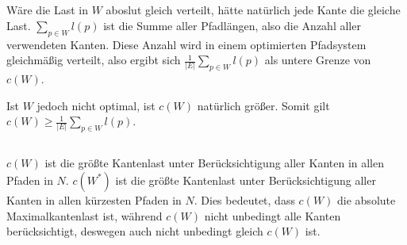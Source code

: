 \documentclass[10pt,a4paper,oneside,ngerman,numbers=noenddot]{scrartcl}
\begin{document}
\section{} %
	\subsection{} %
	\subsection{} %
	\subsection{} %
\section{} %
	\subsection{} %
		Wäre die Last in $W$ aboslut gleich verteilt, hätte natürlich jede Kante die gleiche Last.
		$ \sum_{p \in W} l(p) $ ist die Summe aller Pfadlängen, also die Anzahl aller verwendeten Kanten.
		Diese Anzahl wird in einem optimierten Pfadsystem gleichmäßig verteilt, also ergibt sich
		$ \frac{1}{|E|} \sum_{p \in W} l(p) $ als untere Grenze von $ c(W) $.

		Ist $ W $ jedoch nicht optimal, ist $ c(W) $ natürlich größer. Somit gilt
		$ c(W) \ge \frac{1}{|E|} \sum_{p \in W} l(p) $.
	\subsection{} %
		$ c(W) $ ist die größte Kantenlast unter Berücksichtigung aller Kanten in allen Pfaden in $N$. $ c(W^*) $ ist die größte Kantenlast
		unter Berücksichtigung aller Kanten in allen kürzesten Pfaden in $N$. Dies bedeutet, dass $ c(W) $ die absolute Maximalkantenlast ist,
		während $ c(W) $ nicht unbedingt alle Kanten berücksichtigt, deswegen auch nicht unbedingt gleich $ c(W) $ ist.
\end{document}

